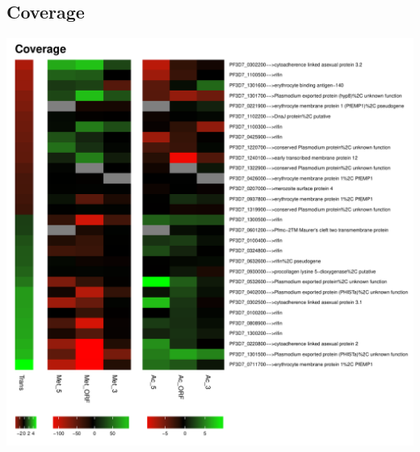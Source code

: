 \documentclass{article}\usepackage[]{graphicx}\usepackage[]{color}
\newenvironment{knitrout}{}{} %
\begin{document}
\subsection{Coverage}
\begin{knitrout}
\color{fgcolor}

{\centering \includegraphics[width=.9\linewidth]{figure/minimal-trans_cov-1} 

}



\end{knitrout}
\clearpage
\end{document}

